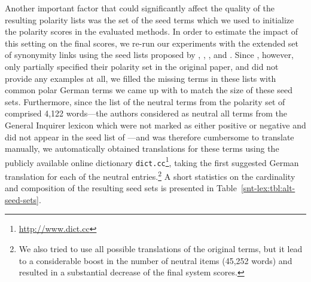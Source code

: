 Another important factor that could significantly affect the quality
of the resulting polarity lists was the set of the seed terms which we
used to initialize the polarity scores in the evaluated methods.  In
order to estimate the impact of this setting on the final scores, we
re-run our experiments with the extended set of synonymity links using
the seed lists proposed by \citet{Hu:04}, \citet{Kim:04},
\citet{Esuli:06c}, and \citet{Remus:10}.  Since \citet{Hu:04},
however, only partially specified their polarity set in the original
paper, and \citet{Kim:04} did not provide any examples at all, we
filled the missing terms in these lists with common polar German terms
we came up with to match the size of these seed sets.  Furthermore,
since the list of the neutral terms from the polarity set of
\citet{Esuli:06c} comprised 4,122 words---the authors considered as
neutral all terms from the General Inquirer lexicon \cite{Stone:66}
which were not marked as either positive or negative and did not
appear in the seed list of \citet{Turney:03}---and was therefore
cumbersome to translate manually, we automatically obtained
translations for these terms using the publicly available online
dictionary \texttt{dict.cc}\footnote{\url{http://www.dict.cc}}, taking
the first suggested German translation for each of the neutral
entries.\footnote{We also tried to use all possible translations of
  the original terms, but it lead to a considerable boost in the
  number of neutral items (45,252 words) and resulted in a substantial
  decrease of the final system scores.} A short statistics on the
cardinality and composition of the resulting seed sets is presented in
Table~\ref{snt-lex:tbl:alt-seed-sets}.

